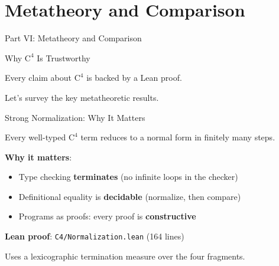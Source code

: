 \documentclass[aspectratio=169,11pt]{beamer}
\newcommand{\Cfour}{\mathrm{C}^4}
\begin{document}

\part{Metatheory and Comparison}

\begin{frame}{Part VI: Metatheory and Comparison}
\begin{center}
{\Large\color{blue} Why $\Cfour$ Is Trustworthy}

\vspace{1em}
Every claim about $\Cfour$ is backed by a Lean proof.

\vspace{0.5em}
Let's survey the key metatheoretic results.
\end{center}
\end{frame}

\begin{frame}{Strong Normalization: Why It Matters}
\begin{theorem}
Every well-typed $\Cfour$ term reduces to a normal form in finitely many steps.
\end{theorem}

\vspace{0.5em}
\textbf{Why it matters}:
\begin{itemize}
\item Type checking \textbf{terminates} (no infinite loops in the checker)
\item Definitional equality is \textbf{decidable} (normalize, then compare)
\item Programs as proofs: every proof is \textbf{constructive}
\end{itemize}

\vspace{0.5em}
\textbf{Lean proof}: \texttt{C4/Normalization.lean} (164 lines)

Uses a lexicographic termination measure over the four fragments.
\end{frame}
\end{document}
